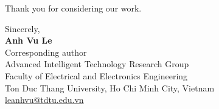 \documentclass[11pt]{article}
\begin{document}
Thank you for considering our work.

Sincerely,\\[0.8em]
\textbf{Anh Vu Le}\\
Corresponding author\\
Advanced Intelligent Technology Research Group\\
Faculty of Electrical and Electronics Engineering\\
Ton Duc Thang University, Ho Chi Minh City, Vietnam\\
\href{mailto:leanhvu@tdtu.edu.vn}{leanhvu@tdtu.edu.vn}
\end{document}
